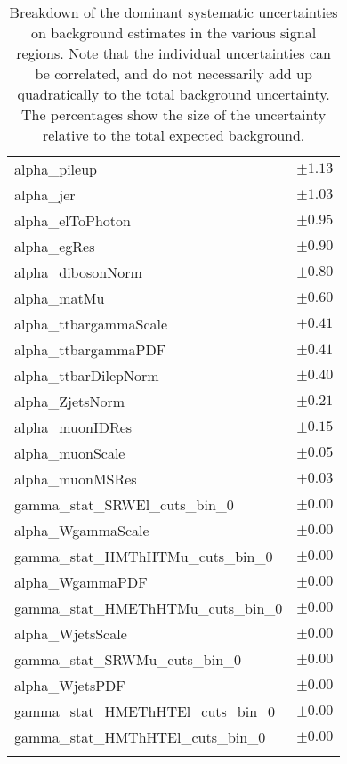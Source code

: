 \begin{table}
\begin{center}
\begin{tabular*}{\textwidth}{@{\extracolsep{\fill}}lc}
alpha\_pileup         & $\pm 1.13$       \\
alpha\_jer         & $\pm 1.03$       \\
alpha\_elToPhoton         & $\pm 0.95$       \\
alpha\_egRes         & $\pm 0.90$       \\
alpha\_dibosonNorm         & $\pm 0.80$       \\
alpha\_matMu         & $\pm 0.60$       \\
alpha\_ttbargammaScale         & $\pm 0.41$       \\
alpha\_ttbargammaPDF         & $\pm 0.41$       \\
alpha\_ttbarDilepNorm         & $\pm 0.40$       \\
alpha\_ZjetsNorm         & $\pm 0.21$       \\
alpha\_muonIDRes         & $\pm 0.15$       \\
alpha\_muonScale         & $\pm 0.05$       \\
alpha\_muonMSRes         & $\pm 0.03$       \\
gamma\_stat\_SRWEl\_cuts\_bin\_0         & $\pm 0.00$       \\
alpha\_WgammaScale         & $\pm 0.00$       \\
gamma\_stat\_HMThHTMu\_cuts\_bin\_0         & $\pm 0.00$       \\
alpha\_WgammaPDF         & $\pm 0.00$       \\
gamma\_stat\_HMEThHTMu\_cuts\_bin\_0         & $\pm 0.00$       \\
alpha\_WjetsScale         & $\pm 0.00$       \\
gamma\_stat\_SRWMu\_cuts\_bin\_0         & $\pm 0.00$       \\
alpha\_WjetsPDF         & $\pm 0.00$       \\
gamma\_stat\_HMEThHTEl\_cuts\_bin\_0         & $\pm 0.00$       \\
gamma\_stat\_HMThHTEl\_cuts\_bin\_0         & $\pm 0.00$       \\
\noalign{\smallskip}\hline\noalign{\smallskip}
\end{tabular*}
\end{center}
\caption[Breakdown of uncertainty on background estimates]{
Breakdown of the dominant systematic uncertainties on background estimates in the various signal regions.
Note that the individual uncertainties can be correlated, and do not necessarily add up quadratically to 
the total background uncertainty. The percentages show the size of the uncertainty relative to the total expected background.
\label{table.results.bkgestimate.uncertainties.WCRhHT}}
\end{table}
%